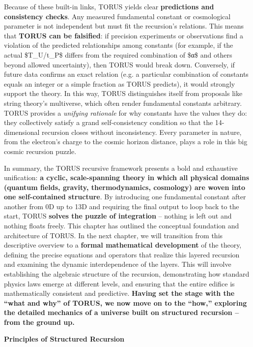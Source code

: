 \documentclass[
]{article}
\begin{document}
Because of these built-in links, TORUS yields clear \textbf{predictions
and consistency checks}. Any measured fundamental constant or
cosmological parameter is not independent but must fit the recursion's
relations. This means that \textbf{TORUS can be falsified}: if precision
experiments or observations find a violation of the predicted
relationships among constants (for example, if the actual \$T\_U/t\_P\$
differs from the required combination of \$α\$ and others beyond allowed
uncertainty), then TORUS would break down\hspace{0pt}. Conversely, if
future data confirms an exact relation (e.g. a particular combination of
constants equals an integer or a simple fraction as TORUS predicts), it
would strongly support the theory. In this way, TORUS distinguishes
itself from proposals like string theory's multiverse, which often
render fundamental constants arbitrary. TORUS provides a \emph{unifying
rationale} for why constants have the values they do: they collectively
satisfy a grand self-consistency condition so that the 14-dimensional
recursion closes without inconsistency. Every parameter in nature, from
the electron's charge to the cosmic horizon distance, plays a role in
this big cosmic recursion puzzle.

In summary, the TORUS recursive framework presents a bold and exhaustive
unification: \textbf{a cyclic, scale-spanning theory in which all
physical domains (quantum fields, gravity, thermodynamics, cosmology)
are woven into one self-contained structure}. By introducing one
fundamental constant after another from 0D up to 13D and requiring the
final output to loop back to the start, TORUS \textbf{solves the puzzle
of integration} -- nothing is left out and nothing floats freely. This
chapter has outlined the conceptual foundation and architecture of
TORUS. In the next chapter, we will transition from this descriptive
overview to a \textbf{formal mathematical development} of the theory,
defining the precise equations and operators that realize this layered
recursion and examining the dynamic interdependence of the layers. This
will involve establishing the algebraic structure of the recursion,
demonstrating how standard physics laws emerge at different levels, and
ensuring that the entire edifice is mathematically consistent and
predictive. \textbf{Having set the stage with the ``what and why'' of
TORUS, we now move on to the ``how,'' exploring the detailed mechanics
of a universe built on structured recursion -- from the ground up.}

\textbf{Principles of Structured Recursion}
\end{document}
